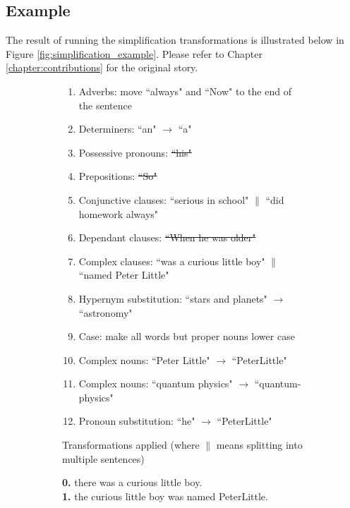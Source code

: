 \subsection{Example}
\label{subsec:simplification_example}

The result of running the simplification transformations is illustrated below in Figure \ref{fig:simplification_example}. Please refer to Chapter \ref{chapter:contributions} for the original story.

\begin{figure}[H]
\begin{subfigure}{\textwidth}
\begin{displayquote}
\begin{enumerate}[label=\protect\circled{\alph*}]
\item Adverbs: move ``always" and ``Now" to the end of the sentence
\item Determiners: ``an" $\rightarrow$ ``a"
\item Possessive pronouns: \st{``his"}
\item Prepositions: \st{``So"}
\item Conjunctive clauses: ``serious in school" $\|$ ``did homework always"
\item Dependant clauses: \st{``When he was older"}
\item Complex clauses: ``was a curious little boy" $\|$ ``named Peter Little"
\item Hypernym substitution: ``stars and planets" $\rightarrow$ ``astronomy"
\item Case: make all words but proper nouns lower case
\item Complex nouns: ``Peter Little" $\rightarrow$ ``PeterLittle"
\item Complex nouns: ``quantum physics" $\rightarrow$ ``quantum-physics"
\item Pronoun substitution: ``he" $\rightarrow$ ``PeterLittle"
\end{enumerate}
\end{displayquote}
\caption{Transformations applied (where $\|$ means splitting into multiple sentences)}
\vspace{\baselineskip}
\end{subfigure}
\begin{subfigure}{\textwidth}
\begin{displayquote}
\textbf{0.} there was a curious little boy.\\
\textbf{1.}  the curious little boy was named  PeterLittle.\\

\end{displayquote}
\end{subfigure}
\end{figure}
